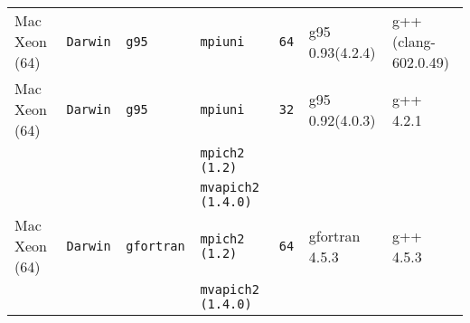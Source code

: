 \begin{longtable}{lllllll}
Mac Xeon (64)         &\tt Darwin &\tt g95          &\tt mpiuni           &\tt 64           & g95 \footnotesize 0.93(4.2.4)       & g++ \footnotesize (clang-602.0.49) \\ %
Mac Xeon (64)         &\tt Darwin &\tt g95          &\tt mpiuni           &\tt 32           & g95 \footnotesize 0.92(4.0.3)       & g++ \footnotesize 4.2.1         \\ %
                      &           &                 &\tt mpich2 (1.2)     &                 &                                     &                                 \\
                      &           &                 &\tt mvapich2 (1.4.0) &                 &                                     &                                 \\
Mac Xeon (64)         &\tt Darwin &\tt gfortran     &\tt mpich2 (1.2)     &\tt 64           & gfortran \footnotesize 4.5.3        & g++ \footnotesize 4.5.3         \\ %
                      &           &                 &\tt mvapich2 (1.4.0) &                 &                                     &                                 \\

\end{longtable}
